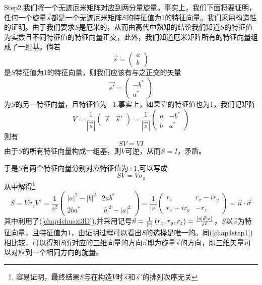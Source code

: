 Step2.我们将一个无迹厄米矩阵对应到两分量旋量。事实上，我们下面将要证明，任何一个旋量$\vec{s}$都是一个无迹厄米矩阵$S$的特征值为1的特征向量。我们采用构造性的证明。由于我们要求$S$是厄米的，从而由高代中熟知的结论我们知道$S$的特征值为实数且不同特征值的特征向量正交，此外，我们知道厄米矩阵所有的特征向量组成了一组基。倘若
\begin{equation}
    \vec{s}=\left(\begin{array}{c}
         a  \\
         b 
    \end{array}\right)
\end{equation}
是$S$特征值为1的特征向量，则我们应该有与之正交的矢量
\begin{equation}
    \vec{s'}=\left(\begin{array}{c}
         -b^{*}  \\
         a^{*} 
    \end{array}\right)
\end{equation}
为$S$的另一特征向量，且特征值为$-1$,事实上，如果$\vec{s}'$的特征值也为1，我们记矩阵
\begin{equation}
    V=\frac{1}{|\vec{s}|}\left(\begin{array}{cc}
        \vec{s} &  \vec{s}'\\
    \end{array}\right)
    =\frac{1}{|\vec{s}|}
    \left(\begin{array}{cc}
        a &  -b^{*}\\
        b & a^{*}
    \end{array}\right)
\end{equation}
则有
\begin{equation}
    SV=VI
\end{equation}
由于$S$的所有特征向量构成一组基，则$V$可逆，从而$S=I$，矛盾。

于是$S$有两个特征向量分别对应特征值为$\pm 1$,可以写成
\begin{equation}
    SV=V\sigma_{z}
\end{equation}
从中解得\footnote{容易证明，最终结果$S$与在构造$V$时$\vec{s}$和$\vec{s}'$的排列次序无关}
\begin{equation}
    S=V\sigma_{z}V^{\dagger}=\frac{1}{s^{2}}\left(
    \begin{array}{cc}
       |a|^{2}-|b|^{2}  & 2ab^{*} \\
        2ba^{*} & |b|^{2}-|a|^{2}
    \end{array}\right)=\frac{1}{|r|}\left(
    \begin{array}{cc}
       r_{z}  & r_{x}-ir_{y} \\
        r_{x}+ir_{y} & -r_{z}
    \end{array}\right)=\vec{n}\cdot\vec{\sigma}
\end{equation}
其中利用了(\ref{chap4shuazi3D}),并采用记号$\vec{n}=\frac{1}{|r|}\left(r_{x},r_{y},r_{z}\right)=\frac{\bra{s}\vec{\sigma}\ket{s}}{s^{2}}$。$S$以$\vec{s}$为特征向量，且特征值为1，由证明过程可以看出$S$的选择是唯一的。同(\ref{chap4step1})相比较，可以得知$S$所对应的三维向量的方向$\vec{n}$即为旋量$\vec{s}$的方向，即三维矢量可以对应到一个相同方向的旋量。

